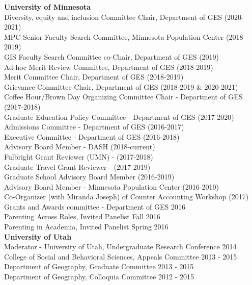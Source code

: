 \documentclass[11pt]{article} %
\begin{document}
\noindent
\textbf{University of Minnesota}\\
Diversity, equity and inclusion Committee Chair, Department of GES (2020-2021)\\
MPC Senior Faculty Search Committee, Minnesota Population Center (2018-2019)\\ 
GIS Faculty Search Committee co-Chair, Department of GES (2019)\\
Ad-hoc Merit Review Committee, Department of GES (2018-2019)\\
Merit Committee Chair, Department of GES (2018-2019)\\
Grievance Committee Chair, Department of GES (2018-2019 & 2020-2021)\\
Coffee Hour/Brown Day Organizing Committee Chair - Department of GES (2017-2018)\\
Graduate Education Policy Committee - Department of GES (2017-2020)\\
Admissions Committee - Department of GES (2016-2017)\\
Executive Committee -  Department of GES (2016-2018)\\ 
Advisory Board Member - DASH (2018-current)\\
Fulbright Grant Reviewer (UMN) - (2017-2018)\\
Graduate Travel Grant Reviewer - (2017-2019)\\
Graduate School Advisory Board Member (2016-2019)\\
Advisory Board Member - Minnesota Population Center (2016-2019)\\
Co-Organizer (with Miranda Joseph) of Counter Accounting Workshop (2017)\\
Grants and Awards committee - Department of GES 2016\\
Parenting Across Roles, Invited Panelist Fall 2016\\
Parenting in Academia, Invited Panelist Spring 2016\\

\noindent
\textbf{University of Utah}\\
Moderator - University of Utah, Undergraduate Research Conference 2014\\
College of Social and Behavioral Sciences, Appeals Committee 2013 - 2015\\
Department of Geography, Graduate Committee 2013 - 2015\\ 
Department of Geography, Colloquia Committee 2012 - 2015\\
\end{document}
